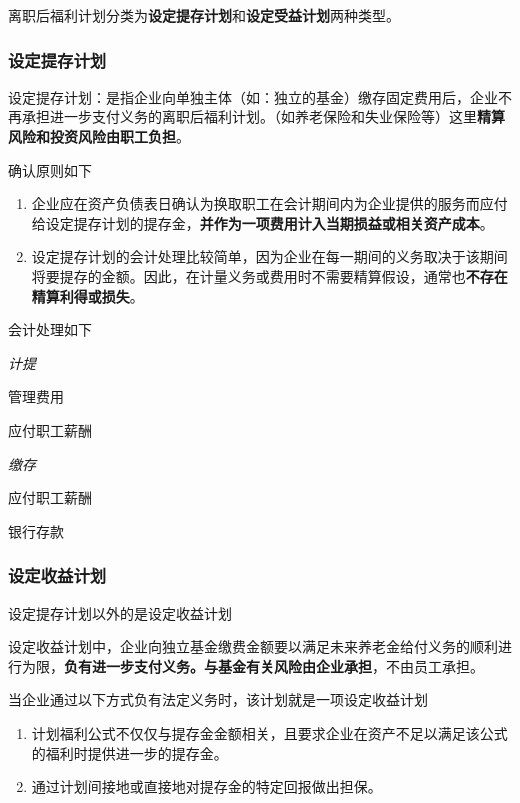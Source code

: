 \documentclass[UTF8,12pt]{ctexart}
\newenvironment{Dr}{%
	\begin{list}{}%
		{
			\setlength{\leftmargin}{2em}
			\setlength{\labelwidth}{2em}
			\setlength{\labelsep}{0pt}
			\setlength{\itemindent}{0pt}
			\setlength{\listparindent}{0pt}
			\setlength{\parsep}{0pt}
			\setlength{\topsep}{0pt}
		}
		\item[\textbf{借：}]
	}{%
	\end{list}
}
\newenvironment{Cr}{%
	\begin{list}{}%
		{
			\setlength{\leftmargin}{2em}
			\setlength{\labelwidth}{2em}
			\setlength{\labelsep}{0pt}
			\setlength{\itemindent}{0pt}
			\setlength{\listparindent}{0pt}
			\setlength{\parsep}{0pt}
			\setlength{\topsep}{0pt}
		}
		\item[\textbf{贷：}]
	}{%
	\end{list}
}
\numberwithin{equation}{section} %
\numberwithin{figure}{section}
\numberwithin{table}{section}
\begin{document}
	离职后福利计划分类为\textbf{设定提存计划}和\textbf{设定受益计划}两种类型。
	
	\subsubsection{设定提存计划}
	设定提存计划：是指企业向单独主体（如：独立的基金）缴存固定费用后，企业不再承担进一步支付义务的离职后福利计划。（如养老保险和失业保险等）这里\textbf{精算风险和投资风险由职工负担}。
	
	确认原则如下
	\begin{enumerate}
		\item 企业应在资产负债表日确认为换取职工在会计期间内为企业提供的服务而应付给设定提存计划的提存金，\textbf{并作为一项费用计入当期损益或相关资产成本}。
		
		\item 设定提存计划的会计处理比较简单，因为企业在每一期间的义务取决于该期间将要提存的金额。因此，在计量义务或费用时不需要精算假设，通常也\textbf{不存在精算利得或损失}。
	\end{enumerate}
	
	会计处理如下
	
	\textit{计提}
	
	\begin{Dr}
		管理费用
	\end{Dr}
	\begin{Cr}
		应付职工薪酬
	\end{Cr}

	\textit{缴存}

	\begin{Dr}
		应付职工薪酬
	\end{Dr}
	\begin{Cr}
		银行存款
	\end{Cr}
	
	\subsubsection{设定收益计划}
	设定提存计划以外的是设定收益计划
	
	设定收益计划中，企业向独立基金缴费金额要以满足未来养老金给付义务的顺利进行为限，\textbf{负有进一步支付义务。与基金有关风险由企业承担}，不由员工承担。
	
	当企业通过以下方式负有法定义务时，该计划就是一项设定收益计划
	\begin{enumerate}
		\item 计划福利公式不仅仅与提存金金额相关，且要求企业在资产不足以满足该公式的福利时提供进一步的提存金。
		
		\item 通过计划间接地或直接地对提存金的特定回报做出担保。
	\end{enumerate}
\end{document}
